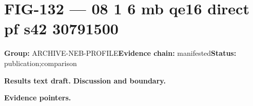 \clearpage
\section{FIG-132 --- 08 1 6 mb qe16 direct pf s42 30791500}
\label{figpage:fig-132}
\textbf{Group:} ARCHIVE-NEB-PROFILE\quad \textbf{Evidence chain:} manifested\quad \textbf{Status:} publication;comparison

\textbf{Results text draft.} 
\textbf{Discussion and boundary.} 


\textbf{Evidence pointers.}



\vfill
